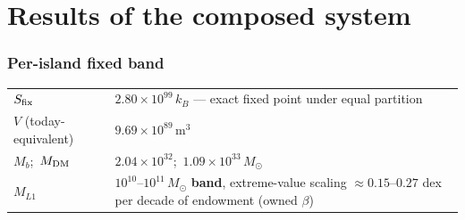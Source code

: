 \documentclass[11pt]{article}
\begin{document}
\clearpage

\part{Results of the composed system}
\setcounter{section}{0}\setcounter{equation}{0}\setcounter{figure}{0}

\section{Per-island fixed band}
\begin{center}\small
\begin{tabular}{ll}\toprule
$S_{\rm fix}$ & $2.80\times10^{99}\,k_B$ --- exact fixed point under equal partition\\
$V$ (today-equivalent) & $9.69\times10^{89}$\,m$^3$\\
$M_b$;\ $M_{\rm DM}$ & $2.04\times10^{32}$;\ $1.09\times10^{33}\,M_\odot$\\
$M_{L1}$ & $10^{10}$--$10^{11}\,M_\odot$ \textbf{band}, extreme-value scaling $\approx0.15$--$0.27$ dex per decade of endowment (owned $\beta$)\\
\bottomrule\end{tabular}\end{center}
\end{document}
